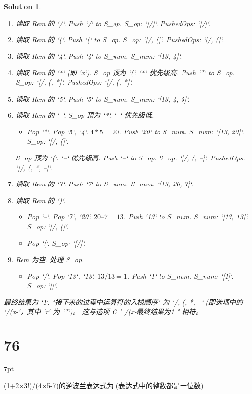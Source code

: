 \documentclass[UTF8]{report}
\newtheorem{solution}{Solution}
\theoremstyle{MyLineTheoremStyle} %
\theoremstyle{MyBlockTheoremStyle} %
\theoremstyle{MySubsubsectionStyle} %
\newenvironment{graybox}{%
        \def\FrameCommand{%
        \hspace{1pt}%
        {\color{gray}\small \vrule width 2pt}%
        {\color{graybox_color}\vrule width 4pt}%
        \colorbox{graybox_color}%
        }%
        \MakeFramed{\advance\hsize-\width\FrameRestore}%
        \noindent\hspace{-4.55pt}%
        \begin{adjustwidth}{}{7pt}%
        \vspace{2pt}\vspace{2pt}%
        }
        {%
        \vspace{2pt}\end{adjustwidth}\endMakeFramed%
        }
\begin{document}
\begin{solution}
\begin{enumerate}
    \item 读取 Rem 的 `/`. Push `/` to S\_op. S\_op: `[/]`. PushedOps: `[/]`.
    \item 读取 Rem 的 `(`. Push `(` to S\_op. S\_op: `[/, (]`. PushedOps: `[/, (]`.
    \item 读取 Rem 的 `4`. Push `4` to S\_num. S\_num: `[13, 4]`.
    \item 读取 Rem 的 `*` (即 `x`). S\_op 顶为 `(`. `*` 优先级高. Push `*` to S\_op. S\_op: `[/, (, *]`. PushedOps: `[/, (, *]`.
    \item 读取 Rem 的 `5`. Push `5` to S\_num. S\_num: `[13, 4, 5]`.
    \item 读取 Rem 的 `–`. S\_op 顶为 `*`. `–` 优先级低.
    \begin{itemize}
        \item Pop `*`. Pop `5`, `4`. $4 * 5 = 20$. Push `20` to S\_num. S\_num: `[13, 20]`. S\_op: `[/, (]`.
    \end{itemize}
    S\_op 顶为 `(`. `–` 优先级高. Push `–` to S\_op. S\_op: `[/, (, –]`. PushedOps: `[/, (, *, –]`.
    \item 读取 Rem 的 `7`. Push `7` to S\_num. S\_num: `[13, 20, 7]`.
    \item 读取 Rem 的 `)`.
    \begin{itemize}
        \item Pop `–`. Pop `7`, `20`. $20 – 7 = 13$. Push `13` to S\_num. S\_num: `[13, 13]`. S\_op: `[/, (]`.
        \item Pop `(`. S\_op: `[/]`.
    \end{itemize}
    \item Rem 为空. 处理 S\_op.
    \begin{itemize}
        \item Pop `/`. Pop `13`, `13`. $13 / 13 = 1$. Push `1` to S\_num. S\_num: `[1]`. S\_op: `[]`.
    \end{itemize}
\end{enumerate}

最终结果为 `1`.
"接下来的过程中运算符的入栈顺序" 为 `/, (, *, –` (即选项中的 `/(x-`，其中 `x` 为 `*`)。
这与选项 C " /(x-最终结果为1 " 相符。
\end{solution}


\section*{76}
\begin{graybox}
(1+2×3!)/(4×5-7)的逆波兰表达式为
(表达式中的整数都是一位数)
\end{graybox}
\end{document}
